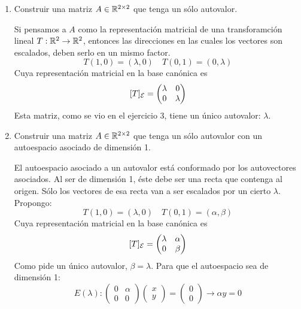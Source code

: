 \item \begin{enumerate}
        \item Construir una matriz $A\in\mathbb{R}^{2\times2}$ que tenga un sólo autovalor.
            \begin{mdframed}[style=s]
                Si pensamos a $A$ como la representación matricial de una transforamción lineal $T:\mathbb{R}^2\to\mathbb{R}^2$, entonces las direcciones en las cuales los vectores son escalados, deben serlo en un mismo factor.
                \[T(1,0)=(\lambda,0)\quad T(0,1)=(0,\lambda)\]
                Cuya representación matricial en la base canónica es
                \[[T]_{\mathcal{E}}=\begin{pmatrix}
                    \lambda&0\\0&\lambda
                \end{pmatrix}\]
                Esta matriz, como se vio en el ejercicio 3, tiene un único autovalor: $\lambda$.
            \end{mdframed}
        \item Construir una matriz $A\in\mathbb{R}^{2\times2}$ que tenga un sólo autovalor con un autoespacio asociado de dimensión 1.
            \begin{mdframed}[style=s]
                El autoespacio asociado a un autovalor está conformado por los autovectores asociados. Al ser de dimensión 1, éste debe ser una recta que contenga al origen. Sólo los vectores de esa recta van a ser escalados por un cierto $\lambda$. Propongo:
                \[T(1,0)=(\lambda,0)\quad T(0,1)=(\alpha,\beta)\]
                Cuya representación matricial en la base canónica es
                \[[T]_{\mathcal{E}}=\begin{pmatrix}
                    \lambda&\alpha\\0&\beta
                \end{pmatrix}\]
                Como pide un único autovalor, $\beta=\lambda$. Para que el autoespacio sea de dimensión 1:
                \[E(\lambda):\begin{pmatrix}
                    0&\alpha\\0&0
                \end{pmatrix}\begin{pmatrix}
                    x\\y
                \end{pmatrix}=\begin{pmatrix}
                    0\\0
                \end{pmatrix}\to \alpha y=0\]

\end{mdframed}
\end{enumerate}

